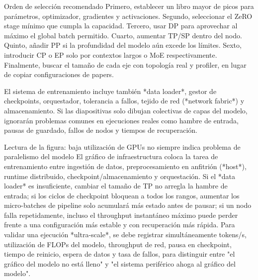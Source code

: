 
\begin{importantbox}{Orden de selección recomendado}
Primero, establecer un libro mayor de picos para parámetros, optimizador, gradientes y activaciones. Segundo, seleccionar el ZeRO stage mínimo que cumpla la capacidad. Tercero, usar DP para aprovechar al máximo el global batch permitido. Cuarto, aumentar TP/SP dentro del nodo. Quinto, añadir PP si la profundidad del modelo aún excede los límites. Sexto, introducir CP o EP solo por contextos largos o MoE respectivamente. Finalmente, buscar el tamaño de cada eje con topología real y profiler, en lugar de copiar configuraciones de papers.
\end{importantbox}

El sistema de entrenamiento incluye también *data loader*, gestor de checkpoints, orquestador, tolerancia a fallos, tejido de red (*network fabric*) y almacenamiento. Si las diapositivas solo dibujan colectivas de capas del modelo, ignorarán problemas comunes en ejecuciones reales como hambre de entrada, pausas de guardado, fallos de nodos y tiempos de recuperación.


\begin{knowledgebox}{Lectura de la figura: baja utilización de GPUs no siempre indica problema de paralelismo del modelo}
El gráfico de infraestructura coloca la tarea de entrenamiento entre ingestión de datos, preprocesamiento en anfitrión (*host*), runtime distribuido, checkpoint/almacenamiento y orquestación. Si el *data loader* es insuficiente, cambiar el tamaño de TP no arregla la hambre de entrada; si los ciclos de checkpoint bloquean a todos los rangos, aumentar los micro-batches de pipeline solo acumulará más estado antes de pausar; si un nodo falla repetidamente, incluso el throughput instantáneo máximo puede perder frente a una configuración más estable y con recuperación más rápida. Para validar una ejecución *ultra-scale*, se debe registrar simultáneamente tokens/s, utilización de FLOPs del modelo, throughput de red, pausa en checkpoint, tiempo de reinicio, espera de datos y tasa de fallos, para distinguir entre "el gráfico del modelo no está lleno" y "el sistema periférico ahoga al gráfico del modelo".
\end{knowledgebox}

